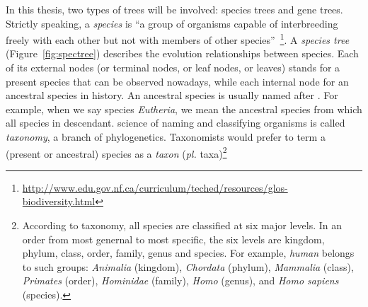 In this thesis, two types of trees will be involved: species trees and gene trees.
Strictly speaking, a \emph{species}
is ``a group of organisms capable of interbreeding freely with each other but not with members of other
species''~\footnote{\href{http://www.edu.gov.nf.ca/curriculum/teched/resources/glos-biodiversity.html}
{http://www.edu.gov.nf.ca/curriculum/teched/resources/glos-biodiversity.html}}.
A \emph{species tree} (Figure~\ref{fig:spectree}) describes the evolution relationships between species.
Each of its external nodes (or terminal nodes, or leaf nodes, or leaves)
stands for a present species that can be observed nowadays, while each
internal node for an ancestral species in history.
An ancestral species is usually named after .
For example, when we say species {\it Eutheria}, we mean the ancestral species from which
all species in  descendant.
 science of naming and classifying organisms is called \emph{taxonomy}, a branch of
phylogenetics.
Taxonomists would prefer to term a (present or ancestral) species as a \emph{taxon}
({\it pl.} taxa)\footnote{According to taxonomy, all species are classified
at six major levels. In an order from most genernal to most specific, the six levels are
kingdom, phylum, class, order,
family, genus and species. For example, {\it human} belongs to
such groups: {\it Animalia} (kingdom), {\it Chordata} (phylum), {\it Mammalia} (class),
{\it Primates} (order), {\it Hominidae} (family), {\it Homo} (genus), and {\it Homo sapiens} (species).}

